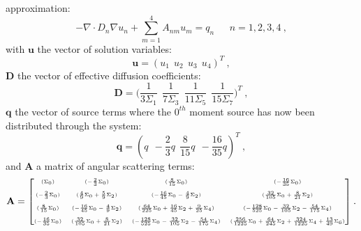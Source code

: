 approximation:
\begin{equation}
  -\nabla \cdot D_n \nabla u_n + \sum_{m=1}^4 A_{nm} u_m =
  q_n\ \ \ \ \ \ \ n = 1,2,3,4\:,
  \label{eq:spn_matrix}
\end{equation}
with $\mathbf{u}$ the vector of solution variables:
\begin{equation}
  \mathbf{u} = ( u_1\ \ u_2\ \ u_3\ \ u_4 )^T \:,
  \label{eq:spn7_solution_vector}
\end{equation}
$\mathbf{D}$ the vector of effective diffusion coefficients:
\begin{equation}
  \mathbf{D} = \Bigg( \frac{1}{3\Sigma_1}\ \ \frac{1}{7\Sigma_3}\ \
  \frac{1}{11\Sigma_5}\ \ \frac{1}{15\Sigma_7} \Bigg)^T\:,
  \label{eq:spn7_diffusion_coeffs}
\end{equation}
$\mathbf{q}$ the vector of source terms where the $0^{th}$ moment
source has now been distributed through the system:
\begin{equation}
  \mathbf{q} = (
  q\ \ -\frac{2}{3}q\ \ \frac{8}{15}q\ \ -\frac{16}{35}q )^T\:,
  \label{eq:spn7_source_vector}
\end{equation}
and $\mathbf{A}$ a matrix of angular scattering terms:
\begin{equation}
  \mathbf{A} = 
  {\tiny \begin{bmatrix}
    (\Sigma_0) &
    (-\frac{2}{3}\Sigma_0) &
    (\frac{8}{15}\Sigma_0) &
    (-\frac{16}{35}\Sigma_0) \\
    &&&\\
    (-\frac{2}{3}\Sigma_0) &
    (\frac{4}{9}\Sigma_0 + \frac{5}{9}\Sigma_2) &
    (-\frac{16}{45}\Sigma_0 - \frac{4}{9}\Sigma_2) &
    (\frac{32}{105}\Sigma_0 + \frac{8}{21}\Sigma_2) \\
    &&&\\
    (\frac{8}{15}\Sigma_0) &
    (-\frac{16}{45}\Sigma_0 - \frac{4}{9}\Sigma_2) &
    (\frac{64}{225}\Sigma_0 + \frac{16}{45}\Sigma_2 + \frac{9}{25}\Sigma_4) &
    (-\frac{128}{525}\Sigma_0 - \frac{32}{105}\Sigma_2 - \frac{54}{175}\Sigma_4)
    \\ 
    &&&\\
    (-\frac{16}{35}\Sigma_0) &
    (\frac{32}{105}\Sigma_0 + \frac{8}{21}\Sigma_2) &
    (-\frac{128}{525}\Sigma_0 - \frac{32}{105}\Sigma_2 - \frac{54}{175}\Sigma_4)
    & 
    (\frac{256}{1225}\Sigma_0 + \frac{64}{245}\Sigma_2 +
    \frac{324}{1225}\Sigma_4 + \frac{13}{49}\Sigma_6)
  \end{bmatrix}}\:.
  \label{eq:A_matrix}
\end{equation}
